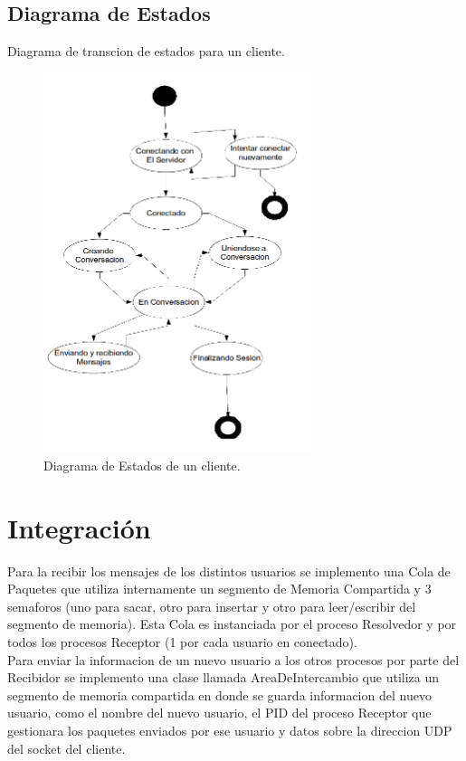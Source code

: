 \documentclass[a4paper,12pt,titlepage]{article}
\begin{document}
\subsection{Diagrama de Estados}
Diagrama de transcion de estados para un cliente.
\begin{figure}[h!]
\centering
\includegraphics[width=0.7\textwidth]{dia_estados_cliente.png}
\caption{Diagrama de Estados de un cliente.}
\label{fig:estados}
\end{figure}

\newpage
\section{Integración}

Para la recibir los mensajes de los distintos usuarios se implemento una Cola de Paquetes que utiliza internamente un segmento de Memoria Compartida y 3 semaforos (uno para sacar, otro para insertar y otro para leer/escribir del segmento de memoria). Esta Cola es instanciada por el proceso Resolvedor y por todos los procesos Receptor (1 por cada usuario en conectado).\\

Para enviar la informacion de un nuevo usuario a los otros procesos por parte del Recibidor se implemento una clase llamada AreaDeIntercambio que utiliza un segmento de memoria compartida en donde se guarda informacion del nuevo usuario, como el nombre del nuevo usuario, el PID del proceso Receptor que gestionara los paquetes enviados por ese usuario y datos sobre la direccion UDP del socket del cliente.\\
\end{document}
